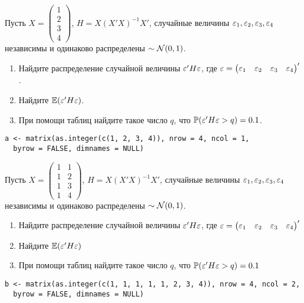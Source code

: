 \begin{problem}
Пусть $X = \begin{pmatrix} 1 \\ 2 \\ 3 \\ 4 \end{pmatrix}$, $H = X(X'X)^{-1}X'$, случайные величины $\varepsilon_1, \varepsilon_2, \varepsilon_3, \varepsilon_4$ независимы и одинаково распределены $\sim \mathcal{N}(0,1)$.
\begin{enumerate}
\item Найдите распределение случайной величины $\varepsilon'H\varepsilon$, где $\varepsilon = \begin{pmatrix} \varepsilon_1 & \varepsilon_2 & \varepsilon_3 & \varepsilon_4 \end{pmatrix}'$.
\item Найдите $\mathbb{E}(\varepsilon'H\varepsilon)$.
\item При помощи таблиц найдите такое число $q$, что $\mathbb{P}(\varepsilon'H\varepsilon > q)=0.1$.
\end{enumerate}


\begin{sol}
\begin{verbatim}
a <- matrix(as.integer(c(1, 2, 3, 4)), nrow = 4, ncol = 1,
  byrow = FALSE, dimnames = NULL)
\end{verbatim}
\end{sol}
\end{problem}




\begin{problem}
Пусть $X = \begin{pmatrix} 1 & 1 \\ 1 & 2 \\ 1 & 3 \\ 1 & 4 \end{pmatrix}$, $H = X(X'X)^{-1}X'$, случайные величины $\varepsilon_1, \varepsilon_2, \varepsilon_3, \varepsilon_4$ независимы и одинаково распределены $\sim \mathcal{N}(0,1)$.
\begin{enumerate}
\item Найдите распределение случайной величины $\varepsilon'H\varepsilon$, где $\varepsilon = \begin{pmatrix} \varepsilon_1 & \varepsilon_2 & \varepsilon_3 & \varepsilon_4 \end{pmatrix}'$
\item Найдите $\mathbb{E}(\varepsilon'H\varepsilon)$
\item При помощи таблиц найдите такое число $q$, что $\mathbb{P}(\varepsilon'H\varepsilon > q)=0.1$
\end{enumerate}


\begin{sol}
\begin{verbatim}
b <- matrix(as.integer(c(1, 1, 1, 1, 1, 2, 3, 4)), nrow = 4, ncol = 2,
  byrow = FALSE, dimnames = NULL)
\end{verbatim}

\end{sol}
\end{problem}



